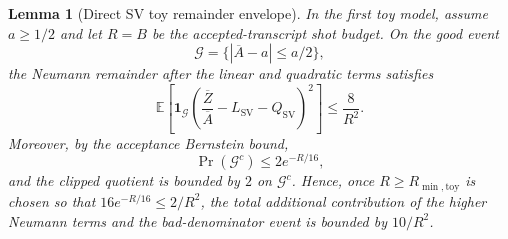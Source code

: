 \documentclass[11pt]{article}
\newtheorem{lemma}{Lemma}
\newcommand{\E}{\mathbb{E}}
\newcommand{\1}{\mathbf{1}}
\newcommand{\abs}[1]{\left\lvert #1 \right\rvert}
\begin{document}
\begin{lemma}[Direct SV toy remainder envelope]
\label{lem:sv_toy_direct_remainder_v13}
In the first toy model, assume \(a\ge1/2\) and let \(R=B\) be the accepted-transcript shot budget.  On the good event
\begin{equation}
    \mathcal G=\{\abs{\overline A-a}\le a/2\},
\end{equation}
the Neumann remainder after the linear and quadratic terms satisfies
\begin{equation}
    \E\!\left[\1_{\mathcal G}\left(\frac{\overline Z}{\overline A}-L_{\mathrm{SV}}-Q_{\mathrm{SV}}\right)^2\right]
    \le \frac{8}{R^2}.
    \label{eq:sv_toy_good_remainder_v13}
\end{equation}
Moreover, by the acceptance Bernstein bound,
\begin{equation}
    \Pr(\mathcal G^c)\le 2e^{-R/16},
\end{equation}
and the clipped quotient is bounded by \(2\) on \(\mathcal G^c\).  Hence, once \(R\ge R_{\min,\mathrm{toy}}\) is chosen so that \(16e^{-R/16}\le 2/R^2\), the total additional contribution of the higher Neumann terms and the bad-denominator event is bounded by \(10/R^2\).
\end{lemma}
\end{document}
